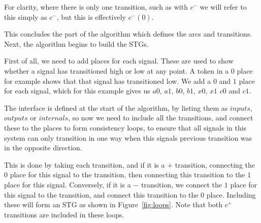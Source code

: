 \documentclass[british,conference,compsoc]{IEEEtran}
\begin{document}
For clarity, where there is only one transition, such as with $c^{-}$
we will refer to this simply as $c^{-}$, but this is effectively $c^{-}(0)$.

This concludes the part of the algorithm which defines the arcs
and transitions. Next, the algorithm begins to build the STGs. 

First of all, we need to add places for each signal. These are used to
show whether a signal has transitioned high or low at any point. 
A token in a $0$ place for example shows that that signal has 
transitioned low. We add a $0$ and $1$ place for each signal, 
which for this example gives us $a0$, $a1$, $b0$, $b1$, $x0$, $x1$
$c0$ and $c1$.


The interface is defined at the start of the algorithm, by listing them as $inputs$,
$outputs$ or $internals$, so now we need to include all the transitions, and
connect these to the places to form consistency loops, to ensure that all signals 
in this system can only transition in one way when this signals previous transition
was in the opposite direction. 

This is done by taking each transition, and if it is a $+$ transition, connecting 
the $0$ place for this signal to the transition, then connecting this transition to 
the $1$ place for this signal. Conversely, if it is a $-$ transition, we connect the
$1$ place for this signal to the transition, and connect this transition to the $0$ 
place. Including these will form an STG as shown in Figure~\ref{fig:loops}. Note
that both $c^{+}$ transitions are included in these loops.
\end{document}
